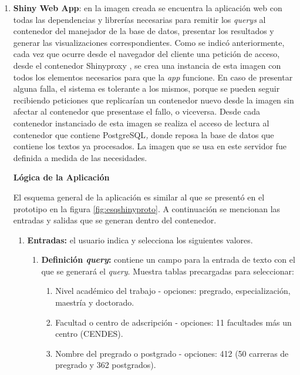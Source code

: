 \documentclass[
  12pt,
  openany]{book}
\begin{document}
\begin{enumerate}
\item
  \textbf{Shiny Web App}: en la imagen creada se encuentra la aplicación web con todas las dependencias y librerías necesarias para remitir los \emph{querys} al contenedor del manejador de la base de datos, presentar los resultados y generar las visualizaciones correspondientes. Como se indicó anteriormente, cada vez que ocurre desde el navegador del cliente una petición de acceso, desde el contenedor Shinyproxy , se crea una instancia de esta imagen con todos los elementos necesarios para que la \emph{app} funcione. En caso de presentar alguna falla, el sistema es tolerante a los mismos, porque se pueden seguir recibiendo peticiones que replicarían un contenedor nuevo desde la imagen sin afectar al contenedor que presentase el fallo, o viceversa. Desde cada contenedor instanciado de esta imagen se realiza el acceso de lectura al contenedor que contiene PostgreSQL\emph{,} donde reposa la base de datos que contiene los textos ya procesados. La imagen que se usa en este servidor fue definida a medida de las necesidades.

  \textbf{Lógica de la Aplicación}

  El esquema general de la aplicación es similar al que se presentó en el prototipo en la figura \ref{fig:esqshinyproto}. A continuación se mencionan las entradas y salidas que se generan dentro del contenedor.

  \begin{enumerate}
  \def\labelenumii{\arabic{enumii}.}
  \item
    \textbf{Entradas:} el usuario indica y selecciona los siguientes valores.

    \begin{enumerate}
    \def\labelenumiii{\roman{enumiii}.}
    \item
      \textbf{Definición \emph{query}:} contiene un campo para la entrada de texto con el que se generará el \emph{query}. Muestra tablas precargadas para seleccionar:

      \begin{enumerate}
      \def\labelenumiv{\arabic{enumiv})}
      \item
        Nivel académico del trabajo - opciones: pregrado, especialización, maestría y doctorado.
      \item
        Facultad o centro de adscripción - opciones: 11 facultades más un centro (CENDES).
      \item
        Nombre del pregrado o postgrado - opciones: 412 (50 carreras de pregrado y 362 postgrados).
      \end{enumerate}


\end{enumerate}
\end{enumerate}
\end{enumerate}
\end{document}

